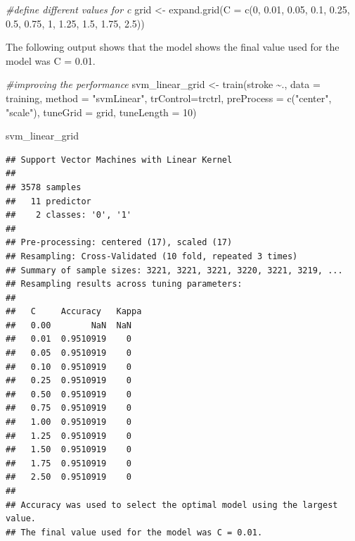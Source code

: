 \documentclass[
]{article}
\newenvironment{Shaded}{\begin{snugshade}}{\end{snugshade}}
\newcommand{\AttributeTok}[1]{\textcolor[rgb]{0.77,0.63,0.00}{#1}}
\newcommand{\CommentTok}[1]{\textcolor[rgb]{0.56,0.35,0.01}{\textit{#1}}}
\newcommand{\DecValTok}[1]{\textcolor[rgb]{0.00,0.00,0.81}{#1}}
\newcommand{\FloatTok}[1]{\textcolor[rgb]{0.00,0.00,0.81}{#1}}
\newcommand{\FunctionTok}[1]{\textcolor[rgb]{0.00,0.00,0.00}{#1}}
\newcommand{\NormalTok}[1]{#1}
\newcommand{\OtherTok}[1]{\textcolor[rgb]{0.56,0.35,0.01}{#1}}
\newcommand{\SpecialCharTok}[1]{\textcolor[rgb]{0.00,0.00,0.00}{#1}}
\newcommand{\StringTok}[1]{\textcolor[rgb]{0.31,0.60,0.02}{#1}}
\renewcommand{\=}[1]{\stackrel{#1}{=}}
\theoremstyle{definition}
\theoremstyle{remark}
\begin{document}
\begin{Shaded}
\begin{Highlighting}[]
\CommentTok{\#define different values for c}
\NormalTok{grid }\OtherTok{\textless{}{-}} \FunctionTok{expand.grid}\NormalTok{(}\AttributeTok{C =} \FunctionTok{c}\NormalTok{(}\DecValTok{0}\NormalTok{, }\FloatTok{0.01}\NormalTok{, }\FloatTok{0.05}\NormalTok{, }\FloatTok{0.1}\NormalTok{, }\FloatTok{0.25}\NormalTok{, }\FloatTok{0.5}\NormalTok{, }\FloatTok{0.75}\NormalTok{, }\DecValTok{1}\NormalTok{, }\FloatTok{1.25}\NormalTok{, }\FloatTok{1.5}\NormalTok{, }\FloatTok{1.75}\NormalTok{, }\FloatTok{2.5}\NormalTok{))}
\end{Highlighting}
\end{Shaded}

The following output shows that the model shows the final value used for the model was C = 0.01.

\begin{Shaded}
\begin{Highlighting}[]
\CommentTok{\#improving the performance}
\NormalTok{svm\_linear\_grid }\OtherTok{\textless{}{-}} \FunctionTok{train}\NormalTok{(stroke }\SpecialCharTok{\textasciitilde{}}\NormalTok{., }\AttributeTok{data =}\NormalTok{ training, }\AttributeTok{method =} \StringTok{"svmLinear"}\NormalTok{,}
                         \AttributeTok{trControl=}\NormalTok{trctrl,}
                         \AttributeTok{preProcess =} \FunctionTok{c}\NormalTok{(}\StringTok{"center"}\NormalTok{, }\StringTok{"scale"}\NormalTok{),}
                         \AttributeTok{tuneGrid =}\NormalTok{ grid,}
                         \AttributeTok{tuneLength =} \DecValTok{10}\NormalTok{)}

\NormalTok{svm\_linear\_grid}
\end{Highlighting}
\end{Shaded}

\begin{verbatim}
## Support Vector Machines with Linear Kernel 
## 
## 3578 samples
##   11 predictor
##    2 classes: '0', '1' 
## 
## Pre-processing: centered (17), scaled (17) 
## Resampling: Cross-Validated (10 fold, repeated 3 times) 
## Summary of sample sizes: 3221, 3221, 3221, 3220, 3221, 3219, ... 
## Resampling results across tuning parameters:
## 
##   C     Accuracy   Kappa
##   0.00        NaN  NaN  
##   0.01  0.9510919    0  
##   0.05  0.9510919    0  
##   0.10  0.9510919    0  
##   0.25  0.9510919    0  
##   0.50  0.9510919    0  
##   0.75  0.9510919    0  
##   1.00  0.9510919    0  
##   1.25  0.9510919    0  
##   1.50  0.9510919    0  
##   1.75  0.9510919    0  
##   2.50  0.9510919    0  
## 
## Accuracy was used to select the optimal model using the largest value.
## The final value used for the model was C = 0.01.
\end{verbatim}
\end{document}
